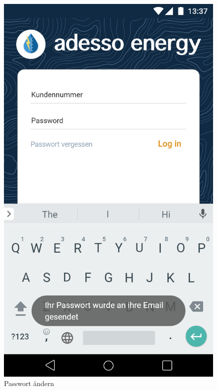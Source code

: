 \begin{figure}[h]
	\includegraphics[scale = 0.22]{img/AndroidMockup/forgotPassword}		
	\caption{Passwort ändern}
	\label{fig:mock-pw}
\end{figure}

